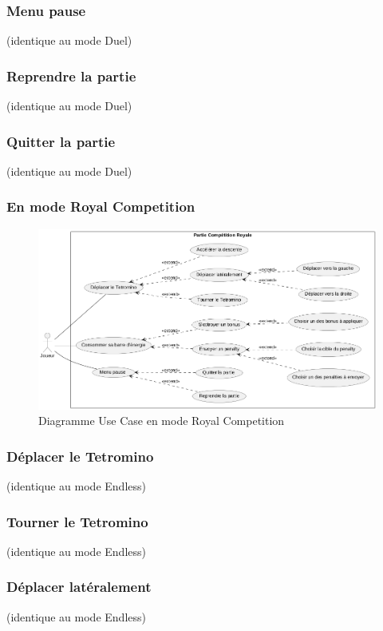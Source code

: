 \documentclass{article}
\begin{document}
\subsubsection*{Menu pause} (identique au mode Duel)
\subsubsection*{Reprendre la partie} (identique au mode Duel)
\subsubsection*{Quitter la partie} (identique au mode Duel)

\subsubsection{En mode Royal Competition}

\begin{figure}[!h]
    \centering
    \includegraphics[width=1\textwidth]{uml/usescase/en-jeu/royal-competition.png}
    \caption{Diagramme Use Case en mode Royal Competition}
    \label{fig:Royal-Competition}
\end{figure}

\subsubsection*{Déplacer le Tetromino} (identique au mode Endless)
\subsubsection*{Tourner le Tetromino} (identique au mode Endless)
\subsubsection*{Déplacer latéralement} (identique au mode Endless)
\end{document}
